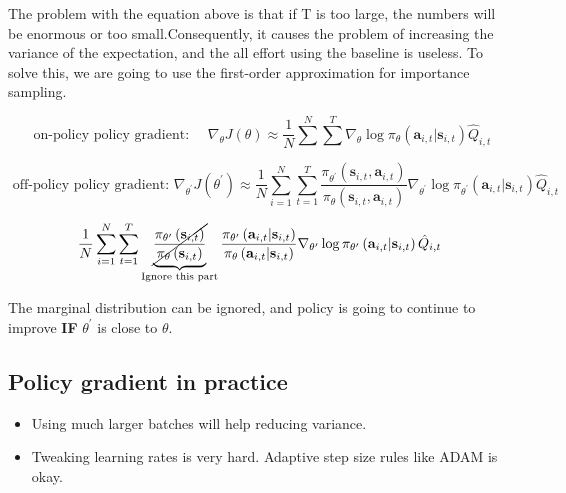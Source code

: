 \documentclass[]{article}
\begin{document}
The problem with the equation above is that if T is too large, the numbers will be enormous or too small.Consequently,
it causes the problem of increasing the variance of the expectation, and the all effort using the baseline is useless.
To solve this, we are going to use the first-order approximation for importance sampling.

\begin{equation*}\text { on-policy policy gradient: } \quad \nabla_{\theta} J(\theta) \approx \frac{1}{N} \sum^{N}
\sum^{T} \nabla_{\theta} \log \pi_{\theta}\left(\mathbf{a}_{i, t} | \mathbf{s}_{i, t}\right) \hat{Q}_{i,
t}\end{equation*}

\begin{equation*}\text { off-policy policy gradient: } \nabla_{\theta^{\prime}} J\left(\theta^{\prime}\right) \approx
\frac{1}{N} \sum_{i=1}^{N} \sum_{t=1}^{T} \frac{\pi_{\theta^{\prime}}\left(\mathbf{s}_{i, t}, \mathbf{a}_{i,
t}\right)}{\pi_{\theta}\left(\mathbf{s}_{i, t}, \mathbf{a}_{i, t}\right)} \nabla_{\theta^{\prime}} \log
\pi_{\theta^{\prime}}\left(\mathbf{a}_{i, t} | \mathbf{s}_{i, t}\right) \hat{Q}_{i, t}\end{equation*}


\begin{equation}\frac{1}{N} \sum_{i=1}^{N} \sum_{t=1}^{T} \underbrace{\cancel{\frac{\pi_{\theta^{\prime}}\left(\mathbf{s}_{i,
t}\right)}{\pi_{\theta}\left(\mathbf{s}_{i, t}\right)}}}_{\text{Ignore this part}} \frac{\pi_{\theta^{\prime}}\left(\mathbf{a}_{i, t} | \mathbf{s}_{i, t}\right)}{\pi_{\theta}\left(\mathbf{a}_{i, t} | \mathbf{s}_{i, t}\right)} \nabla_{\theta^{\prime}} \log \pi_{\theta^{\prime}}\left(\mathbf{a}_{i, t} | \mathbf{s}_{i, t}\right) \hat{Q}_{i, t}\end{equation}

\par The marginal distribution can be ignored, and policy is going to continue to improve \textbf{IF} $\theta^{\prime}$
is close to $\theta$. 

\subsection*{Policy gradient in practice}%
\label{sub:Policy gradient in practice}



\begin{itemize}
    \item Using much larger batches will help reducing variance.
    \item Tweaking learning rates is very hard. Adaptive step size rules like ADAM is okay.
\end{itemize}
\end{document}
